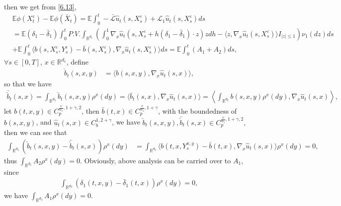 \documentclass[11pt,reqno]{amsart}
\numberwithin{equation}{section}
\begin{document}
then we get from \eqref{6.13},
\begin{align}
	&\mathbb{E}\phi(X_{t}^{\varepsilon})-\mathbb{E}\phi(\bar{X}_{t})
	= \mathbb{E}\int_{0}^{t}-\mathcal{\bar{L}}\hat{u}_{t}(s,X_{s}^{\varepsilon})+\mathcal{L}_{1}\hat{u}_{t}(s,X_{s}^{\varepsilon})ds\nonumber\\
	&=\mathbb{E}(\delta_{1}-\bar{\delta}_{1})\int_{0}^{t}P.V.\int_{\mathbb{R}^{ d_{1}}}\left(\int_{0}^{1}\nabla_{x}\hat{u}_{t}(s,X_{s}^{\varepsilon}+h(\delta_{1}-\bar{\delta}_{1})\cdot z)zdh-\langle  z,\nabla_{x}\hat{u}_{t}(s,X_{s}^{\varepsilon})\rangle I_{|z|\leq1} \right)\nu_{1}(dz)ds\nonumber\\
	&+ \mathbb{E}\int_{0}^{t}\langle b(s,X_{s}^{\varepsilon},Y_{s}^{\varepsilon})- \bar{b}(s,X_{s}^{\varepsilon}),\nabla_{x}\hat{u}_{t}(s,X_{s}^{\varepsilon} )\rangle ds=\mathbb{E}\int_{0}^{t}(A_{1}+A_{2})ds,\label{6.14}
\end{align}
$\forall s\in [0,T]$, $x\in \mathbb{R}^{d_{1}} $, define 
\begin{align}\label{6.15}
\check{b}_{t}(s,x,y)&=\langle  b(s,x,y),\nabla_{x}\hat{u}_{t}(s,x)\rangle, %
\end{align}
so that we have 
\begin{align*}
\bar{\check{b}}_{t}(s,x)=\int_{\mathbb{R}^{d_{2}}}\check{b}_{t}(s,x,y)\rho^{x}(dy)=\langle \bar{b}_{t}(s,x),\nabla_{x}\hat{u}_{t}(s,x)\rangle =\left\langle \int_{\mathbb{R}^{d_{2}}}b(s,x,y)\rho^{x}(dy), \nabla_{x}\hat{u}_{t}(s,x) \right\rangle ,
\end{align*}
let $b(t,x,y)\in C_{p}^{\frac{v}{\alpha_{1}},1+\gamma,2}$, then $\bar{b}(t,x)\in C_{p}^{\frac{v}{\alpha_{1}},1+\gamma} $, with the boundedness of $b(s,x,y)$, and $\hat{u}_{t}(s,x)\in  C^{1,2+\gamma}_{b}$, we have
$ \check{b}_{t}(s,x,y),\bar{\check{b}}_{t}(s,x)\in C_{p}^{\frac{v}{\alpha_{1}},1+\gamma,2},$ then we can see that 
\begin{align*}
	\int_{\mathbb{R}^{ d_{2}}}(\check{b}_{t}(s,x,y)- \bar{\check{b}}_{t}(s,x))\rho^{x}(dy)
	&=\int_{\mathbb{R}^{ d_{2}}}\langle b(t,x,Y_{s}^{x,y})-\bar{b}(t,x),\nabla_{x}\hat{u}_{t}(s,x)\rangle \rho^{x}(dy)=0,
\end{align*}
thus $\int_{\mathbb{R}^{ d_{2}}}A_{2}\rho^{x}(dy)=0$.  %
 Obviously, above analysis can be carried over to $A_{1}$, since 
\begin{align*}
	\int_{\mathbb{R}^{ d_{2}}}\left( \delta_{1}(t,x,y)-\bar{\delta}_{1}(t,x)\right) \rho^{x}(dy)=0,   %
\end{align*}
we have $\int_{\mathbb{R}^{ d_{2}}}A_{1}\rho^{x}(dy)=0$. %
\end{document}
